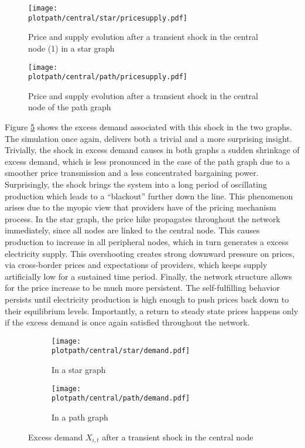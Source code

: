 \newpage
\begin{figure}[H]
  \centering
  \texttt{[image: \\plotpath/central/star/pricesupply.pdf]}
  \caption{Price and supply evolution after a transient shock in the central node (1) in a star graph} \label{fig:transshockcen_star}
\end{figure}

\begin{figure}[H]
  \centering
  \texttt{[image: \\plotpath/central/path/pricesupply.pdf]}
  \caption{Price and supply evolution after a transient shock in the central node of the path graph} \label{fig:transshockcen_path}
\end{figure}
\newpage

Figure \ref{fig:demandshock} shows the excess demand associated with this shock in the two graphs. The simulation once again, delivers both a trivial and a more surprising insight. Trivially, the shock in excess demand causes in both graphs a sudden shrinkage of excess demand, which is less pronounced in the case of the path graph due to a smoother price transmission and a less concentrated bargaining power. Surprisingly, the shock brings the system into a long period of oscillating production which leads to a ``blackout'' further down the line. This phenomenon arises due to the myopic view that providers have of the pricing mechanism process. In the star graph, the price hike propagates throughout the network immediately, since all nodes are linked to the central node. This causes production to increase in all peripheral nodes, which in turn generates a excess electricity supply. This overshooting creates strong downward pressure on prices, via cross-border prices and expectations of providers, which keeps supply artificially low for a sustained time period. Finally, the network structure allows for the price increase to be much more persistent. The self-fulfilling behavior persists until electricity production is high enough to push prices back down to their equilibrium levels. Importantly, a return to steady state prices happens only if the excess demand is once again satisfied throughout the network.

\begin{center}
  \begin{figure}[H]
    \begin{subfigure}{0.475\textwidth}
      \centering
      \texttt{[image: \\plotpath/central/star/demand.pdf]}
      \caption{In a star graph} \label{fig:demandshock_star}
    \end{subfigure} \hfill
    \begin{subfigure}{0.475\textwidth}
      \centering
      \texttt{[image: \\plotpath/central/path/demand.pdf]}
      \caption{In a path graph} \label{fig:demandshock_path}
    \end{subfigure}
    \caption{Excess demand $X_{i, t}$ after a transient shock in the central node} \label{fig:demandshock}
  \end{figure}
\end{center}


